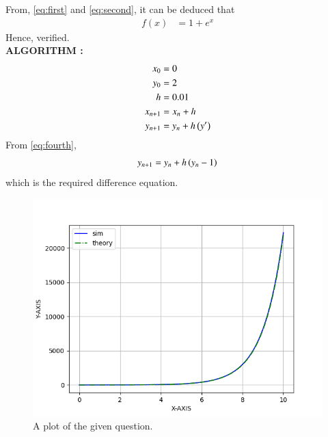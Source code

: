 \documentclass[journal]{IEEEtran}
\begin{document}
From, \eqref{eq:first} and \eqref{eq:second}, it can be deduced that
\begin{align}
	f(x) &= 1 + e^x
\end{align}
Hence, verified. \\
\textbf{ALGORITHM :} \\
\begin{align}
	 x_0 &= 0 \\
	 y_0 &= 2 \\
	 h &= 0.01 \\
	 x_{n+1} &= x_{n} + h \\
	 y_{n+1} &= y_{n} + h \left(y^{\prime}\right) 
\end{align}
From \eqref{eq:fourth}, 
\begin{align}
	y_{n+1} = y_{n} + h \left(y_{n} - 1\right)
\end{align}
which is the required difference equation.

\begin{figure}[h]
				 \centering
				 \includegraphics[width=\columnwidth]{figs/fig.png}
				 \caption{A plot of the given question.}
				 \label{fig:Plot1}
			 \end{figure}
\end{document}
